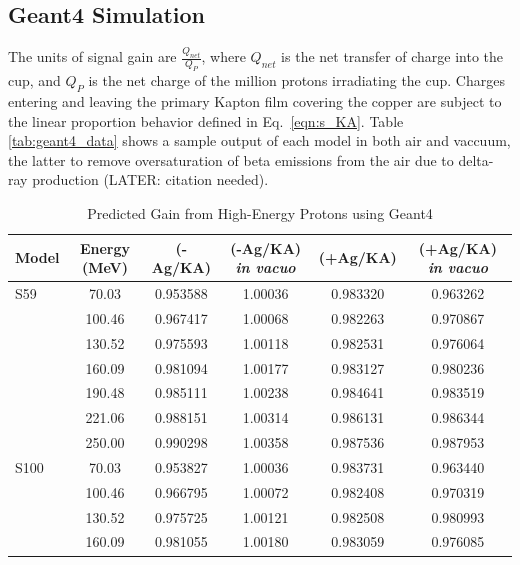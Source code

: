 \documentclass{mc2015}
\begin{document}
\subsection{Geant4 Simulation}

The units of signal gain are $\frac{Q_{net}}{Q_P}$, where $Q_{net}$ is the net transfer of charge into the cup, and $Q_P$ is the net charge of the million protons irradiating the cup.  Charges entering and leaving the primary Kapton film covering the copper are subject to the linear proportion behavior defined in Eq.~\ref{eqn:s_KA}.  Table \ref{tab:geant4_data} shows a sample output of each model in both air and vaccuum, the latter to remove oversaturation of beta emissions from the air due to delta-ray production (LATER: citation needed).

\begin{table}[H]
  \centering
  \caption{Predicted Gain from High-Energy Protons using Geant4}
  \begin{tabular}{lccccc}
    \toprule
    Model & Energy (MeV) & (-Ag/KA) & (-Ag/KA) \emph{in vacuo} & (+Ag/KA) & (+Ag/KA) \emph{in vacuo} \\
    \midrule
    S59 & 70.03  & \num{0.953588} & \num{1.00036} & \num{0.983320} & \num{0.963262} \\
        & 100.46 & \num{0.967417} & \num{1.00068} & \num{0.982263} & \num{0.970867} \\
        & 130.52 & \num{0.975593} & \num{1.00118} & \num{0.982531} & \num{0.976064} \\
        & 160.09 & \num{0.981094} & \num{1.00177} & \num{0.983127} & \num{0.980236} \\
        & 190.48 & \num{0.985111} & \num{1.00238} & \num{0.984641} & \num{0.983519} \\
        & 221.06 & \num{0.988151} & \num{1.00314} & \num{0.986131} & \num{0.986344} \\
        & 250.00 & \num{0.990298} & \num{1.00358} & \num{0.987536} & \num{0.987953} \\
    \midrule
    S100 & 70.03 & \num{0.953827} & \num{1.00036} & \num{0.983731} & \num{0.963440} \\
        & 100.46 & \num{0.966795} & \num{1.00072} & \num{0.982408} & \num{0.970319} \\
        & 130.52 & \num{0.975725} & \num{1.00121} & \num{0.982508} & \num{0.980993} \\
        & 160.09 & \num{0.981055} & \num{1.00180} & \num{0.983059} & \num{0.976085} \\

\end{tabular}
\end{table}
\end{document}

